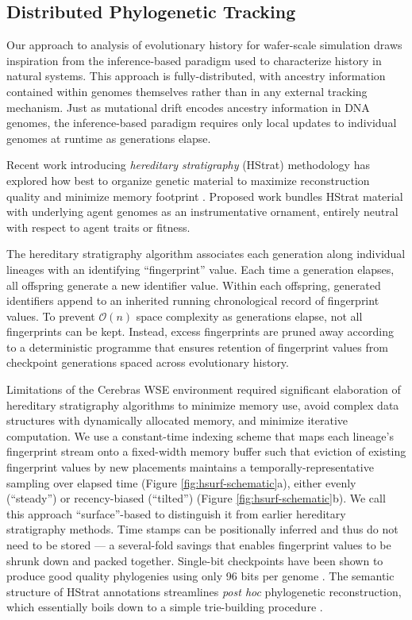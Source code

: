 \subsection{Distributed Phylogenetic Tracking}

Our approach to analysis of evolutionary history for wafer-scale simulation draws inspiration from the inference-based paradigm used to characterize history in natural systems.
This approach is fully-distributed, with ancestry information contained within genomes themselves rather than in any external tracking mechanism.
Just as mutational drift encodes ancestry information in DNA genomes, the inference-based paradigm requires only local updates to individual genomes at runtime as generations elapse.

Recent work introducing \textit{hereditary stratigraphy} (HStrat) methodology has explored how best to organize genetic material to maximize reconstruction quality and minimize memory footprint \citep{moreno2022hstrat, moreno2022hereditary}.
Proposed work bundles HStrat material with underlying agent genomes as an instrumentative ornament, entirely neutral with respect to agent traits or fitness.

The hereditary stratigraphy algorithm associates each generation along individual lineages with an identifying ``fingerprint'' value.
Each time a generation elapses, all offspring generate a new identifier value.
Within each offspring, generated identifiers append to an inherited running chronological record of fingerprint values.
To prevent $\mathcal{O}(n)$ space complexity as generations elapse, not all fingerprints can be kept.
Instead, excess fingerprints are pruned away according to a deterministic programme that ensures retention of fingerprint values from checkpoint generations spaced across evolutionary history.

% 

Limitations of the Cerebras WSE environment required significant elaboration of hereditary stratigraphy algorithms to minimize memory use, avoid complex data structures with dynamically allocated memory, and minimize iterative computation.
We use a constant-time indexing scheme that maps each lineage's fingerprint stream onto a fixed-width memory buffer such that eviction of existing fingerprint values by new placements maintains a temporally-representative sampling over elapsed time (Figure \ref{fig:hsurf-schematic}a), either evenly (``steady'') or recency-biased (``tilted'') (Figure \ref{fig:hsurf-schematic}b).
We call this approach ``surface''-based to distinguish it from earlier hereditary stratigraphy methods.
Time stamps can be positionally inferred and thus do not need to be stored --- a several-fold savings that enables fingerprint values to be shrunk down and packed together.
Single-bit checkpoints have been shown to produce good quality phylogenies using only 96 bits per genome \citep{moreno2023toward}.
The semantic structure of HStrat annotations streamlines \textit{post hoc} phylogenetic reconstruction, which essentially boils down to a simple trie-building procedure
\citep{moreno2024analysis}.
